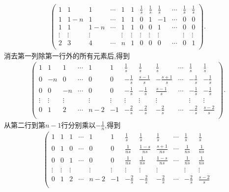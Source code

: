 \documentclass[lang=cn,newtx,10pt,scheme=chinese]{elegantbook}
\begin{document}
\begin{solution}
\begin{gather*}
\left( \begin{matrix}
1&		1&		1&		\cdots&		1&		1&		\frac{1}{s}&		\frac{1}{s}&		\frac{1}{s}&		\cdots&		\frac{1}{s}&		\frac{1}{s}\\
1&		1-n&		1&		\cdots&		1&		1&		0&		1&		-1&		\cdots&		0&		0\\
1&		1&		1-n&		\cdots&		1&		1&		0&		0&		1&		\cdots&		0&		0\\
\vdots&		\vdots&		\vdots&		&		\vdots&		\vdots&		\vdots&		\vdots&		\vdots&		&		\vdots&		\vdots\\
2&		3&		4&		\cdots&		n&		1&		0&		0&		0&		\cdots&		0&		1\\
\end{matrix} \right) .
\end{gather*}
消去第一列除第一行外的所有元素后,得到
\begin{gather*}
\left( \begin{matrix}
1&		1&		1&		\cdots&		1&		1&		\frac{1}{s}&		\frac{1}{s}&		\frac{1}{s}&		\cdots&		\frac{1}{s}&		\frac{1}{s}\\
0&		-n&		0&		\cdots&		0&		0&		-\frac{1}{s}&		\frac{s-1}{s}&		-\frac{s+1}{s}&		\cdots&		-\frac{1}{s}&		-\frac{1}{s}\\
0&		0&		-n&		\cdots&		0&		0&		-\frac{1}{s}&		-\frac{1}{s}&		\frac{s-1}{s}&		\cdots&		-\frac{1}{s}&		-\frac{1}{s}\\
\vdots&		\vdots&		\vdots&		&		\vdots&		\vdots&		\vdots&		\vdots&		\vdots&		&		\vdots&		\vdots\\
0&		1&		2&		\cdots&		n-2&		-1&		-\frac{2}{s}&		-\frac{2}{s}&		-\frac{2}{s}&		\cdots&		-\frac{2}{s}&		\frac{s-2}{s}\\
\end{matrix} \right) .
\end{gather*}
从第二行到第\(n - 1\)行分别乘以\(-\frac{1}{n}\),得到
\begin{gather*}
\left( \begin{matrix}
1&		1&		1&		\cdots&		1&		1&		\frac{1}{s}&		\frac{1}{s}&		\frac{1}{s}&		\cdots&		\frac{1}{s}&		\frac{1}{s}\\
0&		1&		0&		\cdots&		0&		0&		\frac{1}{ns}&		\frac{1-s}{ns}&		\frac{s+1}{ns}&		\cdots&		\frac{1}{ns}&		\frac{1}{ns}\\
0&		0&		1&		\cdots&		0&		0&		\frac{1}{ns}&		\frac{1}{ns}&		\frac{1-s}{ns}&		\cdots&		\frac{1}{ns}&		\frac{1}{ns}\\
\vdots&		\vdots&		\vdots&		&		\vdots&		\vdots&		\vdots&		\vdots&		\vdots&		&		\vdots&		\vdots\\
0&		1&		2&		\cdots&		n-2&		-1&		-\frac{2}{s}&		-\frac{2}{s}&		-\frac{2}{s}&		\cdots&		-\frac{2}{s}&		\frac{s-2}{s}\\

\end{matrix}
\end{gather*}
\end{solution}
\end{document}
